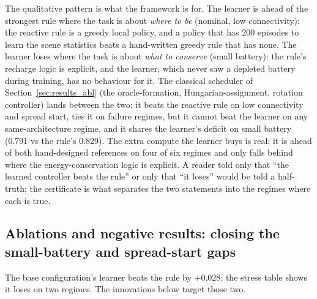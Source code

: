 \documentclass[conference]{IEEEtran}
\begin{document}
The qualitative pattern is what the framework is for.  The learner is ahead
of the strongest rule where the task is about \emph{where to be} (nominal,
low connectivity): the reactive rule is a greedy local policy, and a policy
that has 200 episodes to learn the scene statistics beats a hand-written
greedy rule that has none.  The learner loses where the task is about
\emph{what to conserve} (small battery): the rule's recharge logic is
explicit, and the learner, which never saw a depleted battery during
training, has no behaviour for it.  The classical scheduler of Section~\ref{sec:results_abl}
(the oracle-formation, Hungarian-assignment, rotation controller) lands
between the two: it beats the reactive rule on low connectivity and spread
start, ties it on failure regimes, but it cannot beat the learner on any
same-architecture regime, and it shares the learner's deficit on small
battery (0.791 vs the rule's 0.829).  The extra compute the learner buys is
real: it is ahead of both hand-designed references on four of six regimes
and only falls behind where the energy-conservation logic is explicit.  A reader told only that ``the learned
controller beats the rule'' or only that ``it loses'' would be told a
half-truth; the certificate is what separates the two statements into the
regimes where each is true.


\subsection{Ablations and negative results: closing the small-battery and spread-start gaps}
\label{sec:results_innov}

The base configuration's learner beats the rule by $+0.028$; the stress
table shows it loses on two regimes.  The innovations below target those two.
\end{document}
